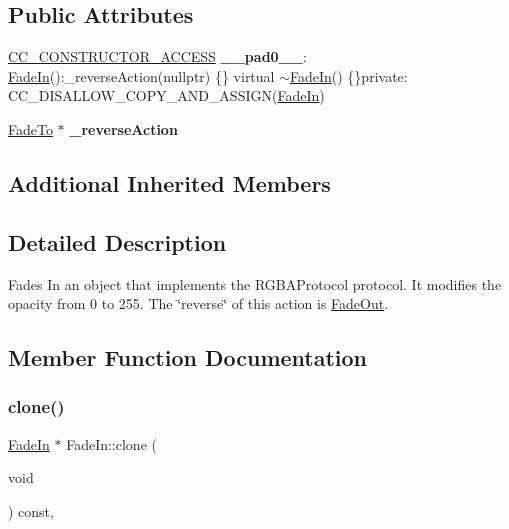 \subsection*{Public Attributes}
\begin{DoxyCompactItemize}
\item 
\mbox{\label{classFadeIn_a30f378fb45b03907b9956b5231ed24de}} 
\hyperlink{_2cocos2d_2cocos_2base_2ccConfig_8h_a25ef1314f97c35a2ed3d029b0ead6da0}{C\+C\+\_\+\+C\+O\+N\+S\+T\+R\+U\+C\+T\+O\+R\+\_\+\+A\+C\+C\+E\+SS} {\bfseries \+\_\+\+\_\+pad0\+\_\+\+\_\+}\+: \hyperlink{classFadeIn}{Fade\+In}()\+:\+\_\+reverse\+Action(nullptr) \{\} virtual $\sim$\hyperlink{classFadeIn}{Fade\+In}() \{\}private\+: C\+C\+\_\+\+D\+I\+S\+A\+L\+L\+O\+W\+\_\+\+C\+O\+P\+Y\+\_\+\+A\+N\+D\+\_\+\+A\+S\+S\+I\+GN(\hyperlink{classFadeIn}{Fade\+In})
\item 
\mbox{\label{classFadeIn_a37a03412eb0320c84b856cc95c300477}} 
\hyperlink{classFadeTo}{Fade\+To} $\ast$ {\bfseries \+\_\+reverse\+Action}
\end{DoxyCompactItemize}
\subsection*{Additional Inherited Members}


\subsection{Detailed Description}
Fades In an object that implements the R\+G\+B\+A\+Protocol protocol. It modifies the opacity from 0 to 255. The \char`\"{}reverse\char`\"{} of this action is \hyperlink{classFadeOut}{Fade\+Out}. 

\subsection{Member Function Documentation}
\mbox{\label{classFadeIn_ab6e6999c3e68cc9157acabd0a7db06d5}} 
\subsubsection{\texorpdfstring{clone()}{clone()}\hspace{0.1cm}{\footnotesize\ttfamily [1/2]}}
{\footnotesize\ttfamily \hyperlink{classFadeIn}{Fade\+In} $\ast$ Fade\+In\+::clone (\begin{DoxyParamCaption}\item[{void}]{ }\end{DoxyParamCaption}) const\hspace{0.3cm}{\ttfamily [override]}, {\ttfamily [virtual]}}

